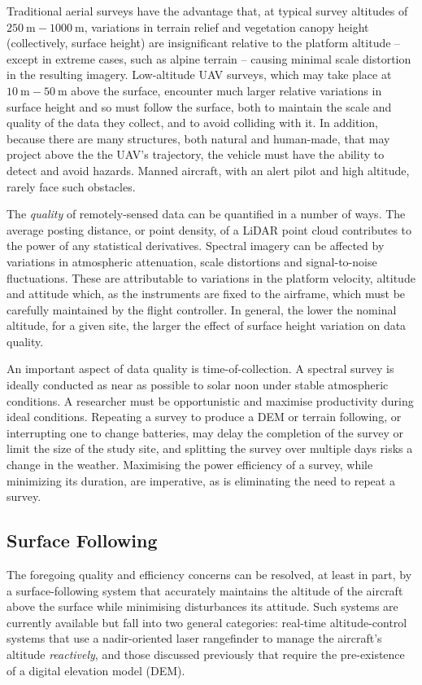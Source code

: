 \documentclass[doc]{apa6}
\begin{document}
Traditional aerial surveys have the advantage that, at typical survey altitudes of $\SI{250}\m-\SI{1000}\m$, variations in terrain relief and vegetation canopy height (collectively, surface height) are insignificant relative to the platform altitude -- except in extreme cases, such as alpine terrain -- causing minimal scale distortion in the resulting imagery. Low-altitude UAV surveys, which may take place at $\SI{10}\m-\SI{50}\m$ above the surface, encounter much larger relative variations in surface height and so must follow the surface, both to maintain the scale and quality of the data they collect, and to avoid colliding with it. In addition, because there are many structures, both natural and human-made, that may project above the the UAV's trajectory, the vehicle must have the ability to detect and avoid hazards. Manned aircraft, with an alert pilot and high altitude, rarely face such obstacles. 

The \emph{quality} of remotely-sensed data can be quantified in a number of ways. The average posting distance, or point density, of a LiDAR point cloud contributes to the power of any statistical derivatives. Spectral imagery can be affected by variations in atmospheric attenuation, scale distortions and signal-to-noise fluctuations. These are attributable to variations in the platform velocity, altitude and attitude which, as the instruments are fixed to the airframe, which must be carefully maintained by the flight controller. In general, the lower the nominal altitude, for a given site, the larger the effect of surface height variation on data quality.

An important aspect of data quality is time-of-collection. A spectral survey is ideally conducted as near as possible to solar noon under stable atmospheric conditions. A researcher must be opportunistic and maximise productivity during ideal conditions. Repeating a survey to produce a DEM or terrain following, or interrupting one to change batteries, may delay the completion of the survey or limit the size of the study site, and splitting the survey over multiple days risks a change in the weather. Maximising the power efficiency of a survey, while minimizing its duration, are imperative, as is eliminating the need to repeat a survey.

\subsection{Surface Following}

The foregoing quality and efficiency concerns can be resolved, at least in part, by a surface-following system that accurately maintains the altitude of the aircraft above the surface while minimising disturbances its attitude. Such systems are currently available but fall into two general categories: real-time altitude-control systems that use a nadir-oriented laser rangefinder to manage the aircraft's altitude \emph{reactively}, and those discussed previously that require the pre-existence of a digital elevation model (DEM).
\end{document}
